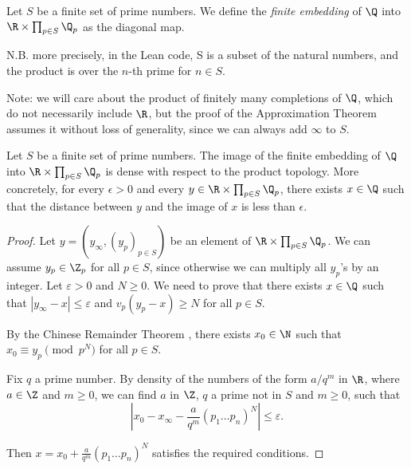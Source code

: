 \begin{definition}
	\label{def:finite_embedding}
	\leanok
Let $S$ be a finite set of prime numbers.
We define the \emph{finite embedding} of $\Q$ into $\R \times \prod_{p \in S} \Q_p$ as the diagonal map.

N.B. more precisely, in the Lean code, S is a subset of the natural numbers, and the product is
over the $n$-th prime for $n \in S$.
\end{definition}

Note: we will care about the product of finitely many completions of $\Q$, which do not necessarily
include $\R$, but the proof of the Approximation Theorem assumes it without loss of generality,
since we can always add $\infty$ to $S$.

\begin{theorem}\label{thm:approximation}%
	\leanok
	Let $S$ be a finite set of prime numbers.
	The image of the finite embedding of $\Q$ into $\R \times \prod_{p \in S} \Q_p$ is dense with respect to
	the product topology. More concretely, for every $\epsilon > 0$ and every
	$y \in \R \times \prod_{p \in S} \Q_p$, there exists $x \in \Q$ such that the distance
	between $y$ and the image of $x$ is less than $\epsilon$.
\end{theorem}
\begin{proof}
	Let $y=(y_\infty, (y_p)_{p \in S})$ be an element of $\R \times \prod_{p \in S} \Q_p$.
	We can assume $y_p \in \Z_p$ for all $p \in S$, since otherwise we can multiply all $y_p$'s by an
	integer. Let $\varepsilon > 0$ and $N \ge 0$. We need to prove that there exists $x \in \Q$ such that
	$|y_\infty - x| \le \varepsilon$ and $v_p(y_p - x) \ge N$ for all $p \in S$.

	By the Chinese Remainder Theorem , there exists $x_0 \in \N$
	such that $x_0 \equiv y_p \pmod{p^N}$ for all $p \in S$.

	Fix $q$ a prime number. By density of the numbers of the form $a/q^m$ in $\R$, where $a \in \Z$
	and $m \ge 0$, we can find $a$ in $\Z$, $q$ a prime not in $S$ and $m \ge 0$, such that
	\[
	|x_0 - x_\infty - \frac{a}{q^m}(p_1\dots p_n)^N| \le \varepsilon.
	\]

	Then $x = x_0 + \frac{a}{q^m}(p_1\dots p_n)^N$ satisfies the required conditions.
\end{proof}


